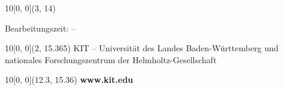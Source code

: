 \begin{titlepage}
  \begin{textblock}{10}[0, 0](3, 14)
    \begin{center}
      Bearbeitungszeit: \timestart \hspace*{0.25cm} -- \hspace*{0.25cm} \timeend
    \end{center}
  \end{textblock}

  \begin{textblock}{10}[0, 0](2, 15.365)
    \tiny{KIT -- Universität des Landes Baden-Württemberg und nationales Forschungszentrum der Helmholtz-Gesellschaft}
  \end{textblock}

  \begin{textblock}{10}[0, 0](12.3, 15.36)
    \small\textbf{www.kit.edu}
  \end{textblock}
\end{titlepage}

